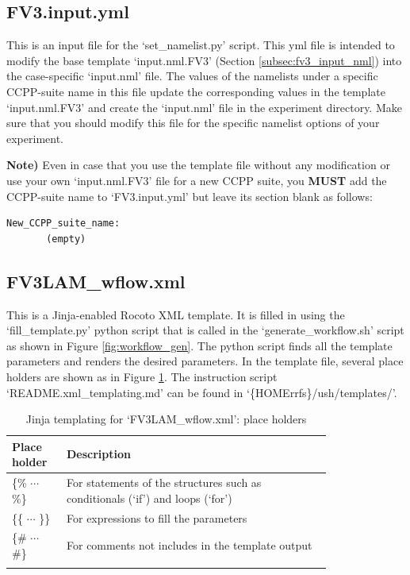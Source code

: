 \documentclass[11pt,fleqn]{report}              %
\begin{document}
\subsection{FV3.input.yml}
\label{subsec:temp_fv3_yml}

This is an input file for the `set\_namelist.py' script. This yml file is intended to modify the base template `input.nml.FV3' (Section \ref{subsec:fv3_input_nml}) into the case-specific `input.nml' file. The values of the namelists under a specific CCPP-suite name in this file update the corresponding values in the template `input.nml.FV3' and create the `input.nml' file in the experiment directory. Make sure that you should modify this file for the specific namelist options of your experiment. 

\vspace{0.3cm}

{\bf Note)} Even in case that you use the template file without any modification or use your own `input.nml.FV3' file for a new CCPP suite, you {\bf MUST} add the CCPP-suite name to `FV3.input.yml' but leave its section blank as follows:
\lstset{language=bash}   
\begin{lstlisting}[frame=trBL]
New_CCPP_suite_name:
       (empty)
\end{lstlisting}


\subsection{FV3LAM\_wflow.xml}
\label{subsec:temp_wflow_xml}

This is a Jinja-enabled Rocoto XML template. It is filled in using the `fill\_template.py' python script that is called in the `generate\_workflow.sh' script as shown in Figure \ref{fig:workflow_gen}. The python script finds all the template parameters and renders the desired parameters. In the template file, several place holders are shown as in Figure \ref{table:jinja_wflow_holders}. The instruction script `README.xml\_templating.md' can be found in `\{HOMErrfs\}/ush/templates/'.
{
\fontsize{10}{12}\selectfont
\begin{longtable}{ p{0.12\linewidth} | p{0.68\linewidth} }
\hline
\hline
 Place holder & Description \\
\hline
 \{\% $\cdots$ \%\}  & For statements of the structures such as conditionals (`if') and loops (`for')  \\
 \{\{ $\cdots$ \}\} & For expressions to fill the parameters \\
 \{\# $\cdots$ \#\} & For comments not includes in the template output \\
\hline
\caption{Jinja templating for `FV3LAM\_wflow.xml': place holders }
\label{table:jinja_wflow_holders}
\end{longtable}
}
\end{document}
